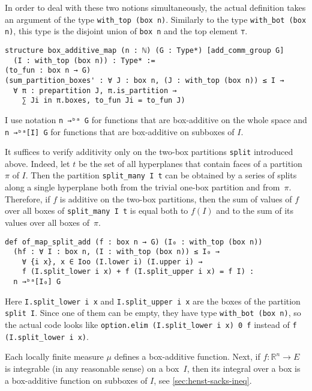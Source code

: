 \documentclass[a4paper, UKenglish,cleveref, autoref, thm-restate]{lipics-v2021}
\newcommand{\bbR}{\mathbb{R}}
\begin{document}
In order to deal with these two notions simultaneously, the actual
definition takes an argument of the type
\lstinline=with_top (box n)=. Similarly to the type
\lstinline=with_bot (box n)=, this type is the disjoint union of
\lstinline=box n= and the top element \lstinline=⊤=.

\begin{lstlisting}
structure box_additive_map (n : ℕ) (G : Type*) [add_comm_group G]
  (I : with_top (box n)) : Type* :=
(to_fun : box n → G)
(sum_partition_boxes' : ∀ J : box n, (J : with_top (box n)) ≤ I →
  ∀ π : prepartition J, π.is_partition →
    ∑ Ji in π.boxes, to_fun Ji = to_fun J)
\end{lstlisting}

I use notation \lstinline=n →ᵇᵃ G= for functions that are box-additive
on the whole space and \lstinline=n →ᵇᵃ[I] G= for functions that are
box-additive on subboxes of \(I\).

It suffices to verify additivity only on the two-box partitions
\lstinline=split= introduced above. Indeed, let \(t\) be the set of
all hyperplanes that contain faces of a partition~\(\pi\) of
\(I\). Then the partition \lstinline=split_many I t= can be obtained
by a series of splits along a single hyperplane both from the trivial
one-box partition and from~\(\pi\). Therefore, if \(f\) is additive on
the two-box partitions, then the sum of values of \(f\) over all boxes
of \lstinline=split_many I t= is equal both to \(f(I)\) and to the sum
of its values over all boxes of~\(\pi\).

\begin{lstlisting}
def of_map_split_add (f : box n → G) (I₀ : with_top (box n))
  (hf : ∀ I : box n, (I : with_top (box n)) ≤ I₀ →
    ∀ {i x}, x ∈ Ioo (I.lower i) (I.upper i) →
    f (I.split_lower i x) + f (I.split_upper i x) = f I) :
  n →ᵇᵃ[I₀] G
\end{lstlisting}

Here \lstinline=I.split_lower i x= and \lstinline=I.split_upper i x=
are the boxes of the partition \lstinline=split I=. Since one of them
can be empty, they have type \lstinline=with_bot (box n)=, so the
actual code looks like \lstinline=option.elim (I.split_lower i x) 0 f=
instead of \lstinline=f (I.split_lower i x)=.

Each locally finite measure \(\mu\) defines a box-additive function.
Next, if \(f\colon\bbR^{n}\to E\) is integrable (in any reasonable
sense) on a box~\(I\), then its integral over a box is a box-additive
function on subboxes of \(I\), see \autoref{sec:henst-sacks-ineq}.
\end{document}
